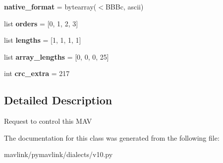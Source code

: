 \begin{DoxyCompactItemize}
\item 
\mbox{\label{classpymavlink_1_1dialects_1_1v10_1_1MAVLink__change__operator__control__message_ad2a61627d8585a309ce2a37b6d3b3ac7}} 
{\bfseries native\+\_\+format} = bytearray(\textquotesingle{}$<$B\+B\+Bc\textquotesingle{}, \textquotesingle{}ascii\textquotesingle{})
\item 
\mbox{\label{classpymavlink_1_1dialects_1_1v10_1_1MAVLink__change__operator__control__message_ace5063fe7ecddeb05798681f68383668}} 
list {\bfseries orders} = \mbox{[}0, 1, 2, 3\mbox{]}
\item 
\mbox{\label{classpymavlink_1_1dialects_1_1v10_1_1MAVLink__change__operator__control__message_a67267d04739c8d88cc54ad06dc896f9f}} 
list {\bfseries lengths} = \mbox{[}1, 1, 1, 1\mbox{]}
\item 
\mbox{\label{classpymavlink_1_1dialects_1_1v10_1_1MAVLink__change__operator__control__message_abe2a7930665d53b1b7eb3c6acfa1e52b}} 
list {\bfseries array\+\_\+lengths} = \mbox{[}0, 0, 0, 25\mbox{]}
\item 
\mbox{\label{classpymavlink_1_1dialects_1_1v10_1_1MAVLink__change__operator__control__message_ab89b5fc9bb808d5e4d63f11371f20912}} 
int {\bfseries crc\+\_\+extra} = 217
\end{DoxyCompactItemize}


\subsection{Detailed Description}
\begin{DoxyVerb}Request to control this MAV
\end{DoxyVerb}
 

The documentation for this class was generated from the following file\+:\begin{DoxyCompactItemize}
\item 
mavlink/pymavlink/dialects/v10.\+py\end{DoxyCompactItemize}
